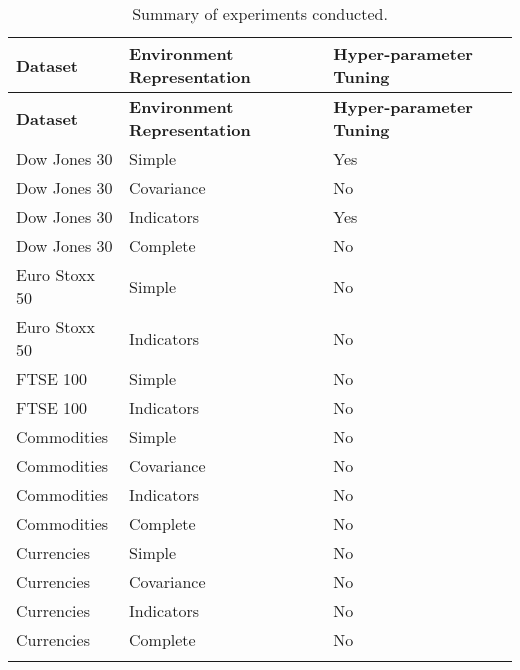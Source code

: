 \begin{longtable}{|p{3cm}|p{3cm}|p{3.5cm}|p{3.5cm}|}
    \hline
    \textbf{Dataset} & \textbf{Environment Representation} & \textbf{Hyper-parameter Tuning} \\ \midrule
    \endfirsthead

    \hline
    \textbf{Dataset} & \textbf{Environment Representation} & \textbf{Hyper-parameter Tuning} \\ \midrule
    \endhead

    \endfoot
    \hline
    Dow Jones 30    & Simple         & Yes \\ \hline
    Dow Jones 30    & Covariance     & No \\ \hline
    Dow Jones 30    & Indicators     & Yes \\ \hline
    Dow Jones 30    & Complete       & No \\ \hline
    Euro Stoxx 50   & Simple         & No  \\ \hline
    Euro Stoxx 50   & Indicators     & No  \\ \hline
    FTSE 100        & Simple         & No  \\ \hline
    FTSE 100        & Indicators     & No  \\ \hline
    Commodities     & Simple         & No  \\ \hline
    Commodities     & Covariance     & No  \\ \hline
    Commodities     & Indicators     & No  \\ \hline
    Commodities     & Complete       & No  \\ \hline
    Currencies      & Simple         & No  \\ \hline
    Currencies      & Covariance     & No  \\ \hline
    Currencies      & Indicators     & No  \\ \hline
    Currencies      & Complete       & No  \\ \hline
\caption{Summary of experiments conducted.}
\label{tab:experiments-summary}
\end{longtable}
